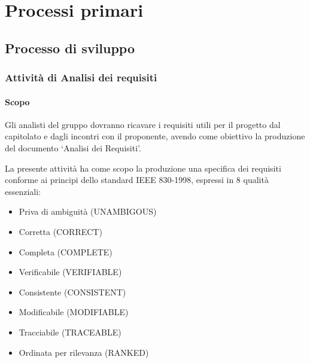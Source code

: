 

\chapter{Processi primari}
	\section{Processo di sviluppo}
		\subsection{Attività di Analisi dei requisiti}
			\subsubsection{Scopo}
				Gli analisti del gruppo dovranno ricavare i requisiti utili per il progetto
				dal capitolato e dagli incontri con il proponente, avendo come obiettivo la
				produzione del documento `Analisi dei Requisiti'.
			
			La presente attività ha come scopo la produzione una specifica dei
			requisiti conforme ai principi dello standard IEEE 830-1998, espressi in 8 qualità
			essenziali:
				\begin{itemize}
				\item Priva di ambiguità (UNAMBIGOUS)
				\item Corretta (CORRECT)
				\item Completa (COMPLETE)
				\item Verificabile (VERIFIABLE)
				\item Consistente (CONSISTENT)
				\item Modificabile (MODIFIABLE)
				\item Tracciabile (TRACEABLE)
				\item Ordinata per rilevanza (RANKED)
				\end{itemize}
			
